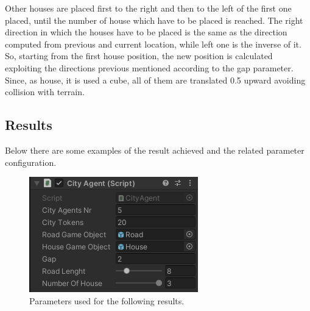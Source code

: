 \documentclass[12pt]{article}
\begin{document}
    Other houses are placed first to the right and then to the left of the first one placed, until the number of house which have to be placed is reached. The right direction in which
    the houses have to be placed is the same as the direction computed from previous and current location, while left one is the inverse of it. So, starting from the first house position,
    the new position is calculated exploiting the directions previous mentioned according to the gap parameter. Since, as house, it is used a cube, all of them are translated 0.5 upward
    avoiding collision with terrain.

    \subsection{Results}
    Below there are some examples of the result achieved and the related parameter configuration.

    \begin{figure}[H]
        \centering
        \includegraphics[scale = 0.8]{images/City Agent/1/Parameters}
        \caption{Parameters used for the following results.}
    \end{figure}

    \begin{figure}[H]
        \centering     %
    \end{figure}
\end{document}
